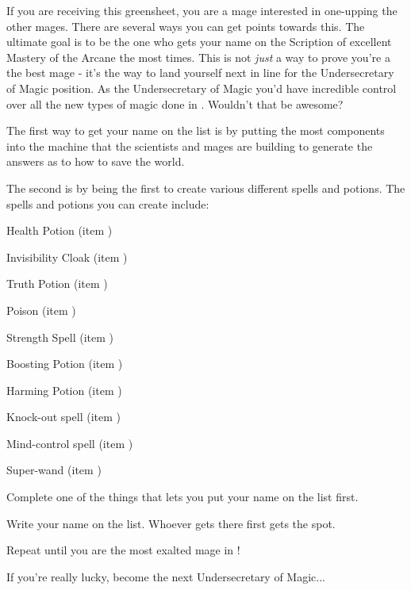\documentclass[green]{guildcamp3}
\begin{document}
	
	\name{\gMPublishing{}}
	
	
	
	If you are receiving this greensheet, you are a mage interested in one-upping the other mages. There are several ways you can get points towards this. The ultimate goal is to be the one who gets your name on the Scription of excellent Mastery of the Arcane the most times. This is not \emph{just} a way to prove you're a the best mage - it's the way to land yourself next in line for the Undersecretary of Magic position. As the Undersecretary of Magic you'd have incredible control over all the new types of magic done in \bMagicWorld{}. Wouldn't that be awesome?
	
	
	The first way to get your name on the list is by putting the most components into the machine that the scientists and mages are building to generate the answers as to how to save the world.
	
	The second is by being the first to create various different spells and potions. The spells and potions you can create include:
	
	Health Potion (item \iHealthPotion{\MYnumber})
	
	Invisibility Cloak (item \iInvisibilityCloak{\MYnumber})
	
	Truth Potion (item \iTruthPotion{\MYnumber})
	
	Poison (item \iMagicPoison{\MYnumber})
	
	Strength Spell (item \iStrengthSpell{\MYnumber})
	
	Boosting Potion (item \iCRUpPotion{\MYnumber})
	
	Harming Potion (item \iCRDownPotion{\MYnumber})
	
	Knock-out spell (item \iKOSpell{\MYnumber})
	
	Mind-control spell (item \iMCSpell{\MYnumber})
	
	Super-wand (item \iUpgradedMagicGun{})
	
	
	\begin{enum}[Directions]
		\item Complete one of the things that lets you put your name on the list first.
		\item Write your name on the list. Whoever gets there first gets the spot. 
		\item Repeat until you are the most exalted mage in \bMagicWorld{}!
		\item If you're really lucky, become the next Undersecretary of Magic...
	\end{enum}
	
	
\end{document}
